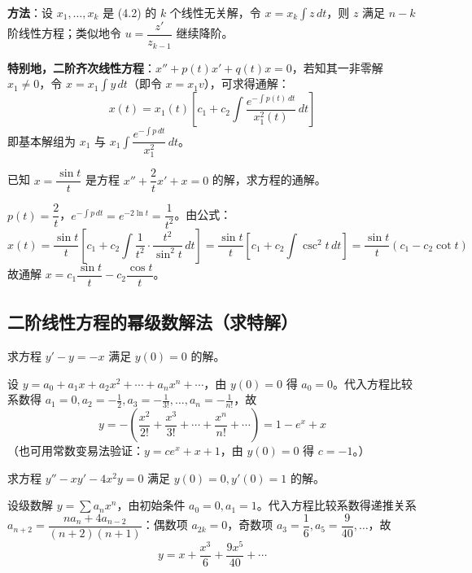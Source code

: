 \textbf{方法}：设 $x_1, \ldots, x_k$ 是 (4.2) 的 $k$ 个线性无关解，令 $x = x_k\int z\,dt$，则 $z$ 满足 $n-k$ 阶线性方程；类似地令 $u = \dfrac{z'}{z_{k-1}}$ 继续降阶。

\textbf{特别地，二阶齐次线性方程}：$x'' + p(t)x' + q(t)x = 0$，若知其一非零解 $x_1 \neq 0$，令 $x = x_1\int y\,dt$（即令 $x = x_1 v$），可求得通解：
$$x(t) = x_1(t)\left[c_1 + c_2\int \frac{e^{-\int p(t)\,dt}}{x_1^2(t)}\,dt\right]$$
即基本解组为 $x_1$ 与 $x_1\int\dfrac{e^{-\int p\,dt}}{x_1^2}\,dt$。

\begin{example}
已知 $x = \dfrac{\sin t}{t}$ 是方程 $x'' + \dfrac{2}{t}x' + x = 0$ 的解，求方程的通解。
\end{example}

\begin{solution}
$p(t) = \dfrac{2}{t}$，$e^{-\int p\,dt} = e^{-2\ln t} = \dfrac{1}{t^2}$。由公式：
$$x(t) = \frac{\sin t}{t}\left[c_1 + c_2\int \frac{1}{t^2}\cdot\frac{t^2}{\sin^2 t}\,dt\right] = \frac{\sin t}{t}\left[c_1 + c_2\int\csc^2 t\,dt\right] = \frac{\sin t}{t}(c_1 - c_2\cot t)$$
故通解 $x = c_1\dfrac{\sin t}{t} - c_2\dfrac{\cos t}{t}$。
\end{solution}

\subsection{二阶线性方程的幂级数解法（求特解）}

\begin{example}
求方程 $y' - y = -x$ 满足 $y(0) = 0$ 的解。
\end{example}

\begin{solution}
设 $y = a_0 + a_1x + a_2x^2 + \cdots + a_nx^n + \cdots$，由 $y(0) = 0$ 得 $a_0 = 0$。代入方程比较系数得 $a_1 = 0, a_2 = -\frac{1}{2}, a_3 = -\frac{1}{3!}, \ldots, a_n = -\frac{1}{n!}$，故
$$y = -\left(\frac{x^2}{2!} + \frac{x^3}{3!} + \cdots + \frac{x^n}{n!} + \cdots\right) = 1 - e^x + x$$
（也可用常数变易法验证：$y = ce^x + x + 1$，由 $y(0)=0$ 得 $c = -1$。）
\end{solution}

\begin{example}
求方程 $y'' - xy' - 4x^2y = 0$ 满足 $y(0) = 0, y'(0) = 1$ 的解。
\end{example}

\begin{solution}
设级数解 $y = \sum a_n x^n$，由初始条件 $a_0 = 0, a_1 = 1$。代入方程比较系数得递推关系 $a_{n+2} = \dfrac{n a_n + 4a_{n-2}}{(n+2)(n+1)}$：偶数项 $a_{2k} = 0$，奇数项 $a_3 = \dfrac{1}{6}, a_5 = \dfrac{9}{40}, \ldots$，故
$$y = x + \frac{x^3}{6} + \frac{9x^5}{40} + \cdots$$
\end{solution}

